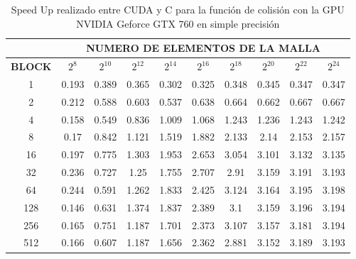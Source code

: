 \begin{table}[h!]
\centering
    \begin{tabular}{|c|c|c|c|c|c|c|c|c|c|}
    \hline
                   & \multicolumn{9}{c|}{\textbf{NUMERO DE ELEMENTOS DE LA MALLA}} \\ \hline
    \textbf{BLOCK} & $2^{8}$ & $2^{10}$& $2^{12}$& $2^{14}$& $2^{16}$& $2^{18}$& $2^{20}$& $2^{22}$& $2^{24}$\\ \hline
		1                               & 0.193   & 0.389    & 0.365    & 0.302    & 0.325    & 0.348    & 0.345    & 0.347    & 0.347 \\ \hline
		2                               & 0.212   & 0.588    & 0.603    & 0.537    & 0.638    & 0.664    & 0.662    & 0.667    & 0.667 \\ \hline
		4                               & 0.158   & 0.549    & 0.836    & 1.009    & 1.068    & 1.243    & 1.236    & 1.243    & 1.242 \\ \hline
		8                               & 0.17    & 0.842    & 1.121    & 1.519    & 1.882    & 2.133    & 2.14     & 2.153    & 2.157 \\ \hline
		16                              & 0.197   & 0.775    & 1.303    & 1.953    & 2.653    & 3.054    & 3.101    & 3.132    & 3.135 \\ \hline
		32                              & 0.236   & 0.727    & 1.25     & 1.755    & 2.707    & 2.91     & 3.159    & 3.191    & 3.193 \\ \hline
		64                              & 0.244   & 0.591    & 1.262    & 1.833    & 2.425    & 3.124    & 3.164    & 3.195    & 3.198 \\ \hline
		128                             & 0.146   & 0.631    & 1.374    & 1.837    & 2.389    & 3.1      & 3.159    & 3.196    & 3.194 \\ \hline
		256                             & 0.165   & 0.751    & 1.187    & 1.701    & 2.373    & 3.107    & 3.157    & 3.181    & 3.194 \\ \hline
		512                             & 0.166   & 0.607    & 1.187    & 1.656    & 2.362    & 2.881    & 3.152    & 3.189    & 3.193 \\ \hline

    \end{tabular}
    \caption{Speed Up realizado entre CUDA y C para la función de colisión con la GPU NVIDIA Geforce GTX 760 en simple precisión}
    \label{tab:s_cuda_760_test_simple_10}
    \end{table}
